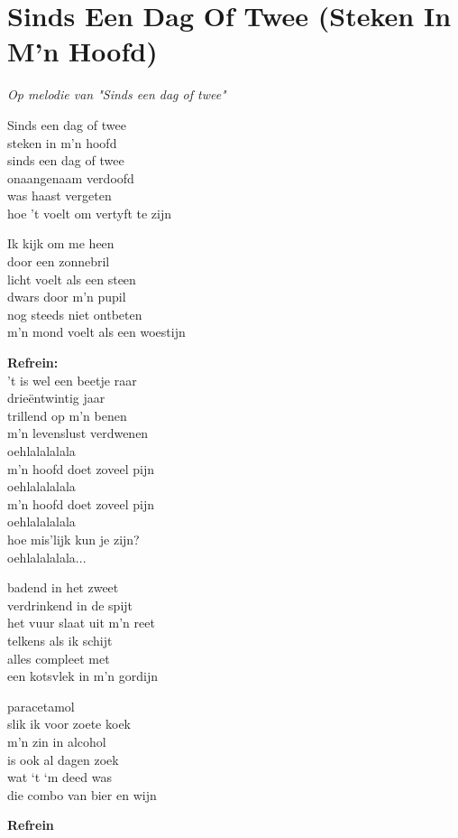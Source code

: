 \section{Sinds Een Dag Of Twee (Steken In M'n Hoofd)}
\textit{Op melodie van "Sinds een dag of twee"}

Sinds een dag of twee\\
steken in m'n hoofd\\
sinds een dag of twee\\
onaangenaam verdoofd\\
was haast vergeten\\
hoe 't voelt om vertyft te zijn

Ik kijk om me heen\\
door een zonnebril\\
licht voelt als een steen\\
dwars door m'n pupil\\
nog steeds niet ontbeten\\
m'n mond voelt als een woestijn

\textbf{Refrein:}\\
't is wel een beetje raar\\
drieëntwintig jaar\\
trillend op m'n benen\\
m'n levenslust verdwenen\\
oehlalalalala\\
m'n hoofd doet zoveel pijn\\
oehlalalalala\\
m'n hoofd doet zoveel pijn\\
oehlalalalala\\
hoe mis’lijk kun je zijn?\\
oehlalalalala...

badend in het zweet\\
verdrinkend in de spijt\\
het vuur slaat uit m’n reet\\
telkens als ik schijt\\
alles compleet met\\
een kotsvlek in m’n gordijn

paracetamol \\
slik ik voor zoete koek\\
m'n zin in alcohol\\
is ook al dagen zoek\\
wat ‘t ‘m deed was\\
die combo van bier en wijn

\textbf{Refrein}